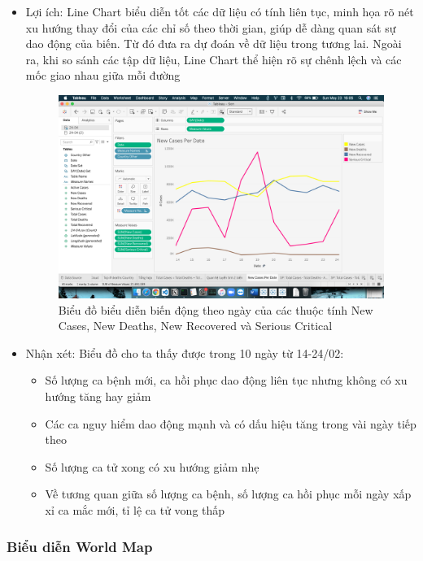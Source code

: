 \documentclass[a4paper, 12pt]{article}
\begin{document}
\begin{itemize}
    \item Lợi ích: Line Chart biểu diễn tốt các dữ liệu có tính liên tục, minh họa rõ nét xu hướng thay đổi của các chỉ số theo thời gian, giúp dễ dàng quan sát sự dao động của biến. Từ đó đưa ra dự đoán về dữ liệu trong tương lai. Ngoài ra, khi so sánh các tập dữ liệu, Line Chart thể hiện rõ sự chênh lệch và các mốc giao nhau giữa mỗi đường
    \begin{figure}[H]
        \begin{center}
            \includegraphics[scale=0.4]{img/lineChart1.png}
            \caption{Biểu đồ biểu diễn biến động theo ngày của các thuộc tính New Cases, New Deaths, New Recovered và Serious Critical}
        \end{center}
    \end{figure}

    \item Nhận xét: Biểu đồ cho ta thấy được trong 10 ngày từ 14-24/02:
    \begin{itemize}
        \item Số lượng ca bệnh mới, ca hồi phục dao động liên tục nhưng không có xu hướng tăng hay giảm
        \item Các ca nguy hiểm dao động mạnh và có dấu hiệu tăng trong vài ngày tiếp theo
        \item Số lượng ca tử xong có xu hướng giảm nhẹ
        \item Về tương quan giữa số lượng ca bệnh, số lượng ca hồi phục mỗi ngày xấp xỉ ca mắc mới, tỉ lệ ca tử vong thấp
    \end{itemize}
\end{itemize}

\subsubsection{Biểu diễn World Map}
\end{document}
